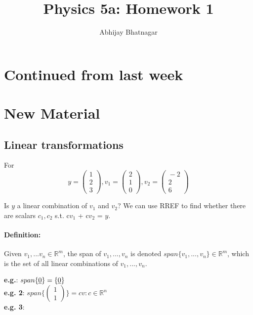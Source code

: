 \documentclass[11pt, notitlepage]{report}
\makeatletter
\newcommand{\R}{\mathbb{R}}
\newcommand{\un}[1]{\text{\underline{#1}}}
\newenvironment{definition}{\paragraph{Definition:}}{\hfill}
\newcommand*{\toccontents}{\@starttoc{toc}}
\makeatother
\begin{document}
   \title{Physics 5a: Homework 1}
   \author{Abhijay Bhatnagar}
   \maketitle
   \toccontents



\setcounter{secnumdepth}{0} %
\section{Continued from last week}


\section{New Material}
\subsection{Linear transformations}

For \[y = \left(\begin{matrix}{}
  1 \\
  2 \\
  3
\end{matrix}\right),
v_1 = \left(\begin{matrix}{}
  2 \\
  1 \\
  0
\end{matrix}\right),
v_2 = \left(\begin{matrix}{}
  -2 \\
  2 \\
  6
\end{matrix}\right)
\]


Is $y$ a linear combination of  $v_1$ and $v_2$? We can use RREF to find whether there are scalars $c_1, c_2$ s.t. c$v_1$ + c$v_2$ = $y$.


\begin{definition}
	Given $v_1,...v_n \in \R^m$, the span of $v_1,...,v_n$ is denoted $span\{v_1,...,v_n\}  \in \R^m$, which is the set of all linear combinations of $v_1,...,v_n$.
\end{definition}

\textbf{e.g.}: $span\{\un{0}\} = \{\un{0}\}$ \\
\textbf{e.g. 2}: $span\{\left(\begin{matrix}{}
						  1 \\
						  1\end{matrix}\right)\} = cv: c \in \R^n$ \\
\textbf{e.g. 3}: 
\end{document}
